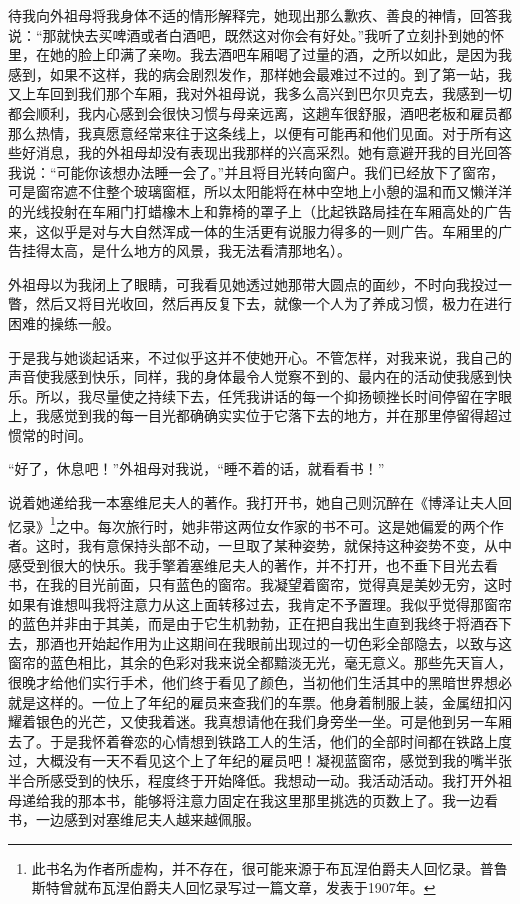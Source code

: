 \par 待我向外祖母将我身体不适的情形解释完，她现出那么歉疚、善良的神情，回答我说：“那就快去买啤酒或者白酒吧，既然这对你会有好处。”我听了立刻扑到她的怀里，在她的脸上印满了亲吻。我去酒吧车厢喝了过量的酒，之所以如此，是因为我感到，如果不这样，我的病会剧烈发作，那样她会最难过不过的。到了第一站，我又上车回到我们那个车厢，我对外祖母说，我多么高兴到巴尔贝克去，我感到一切都会顺利，我内心感到会很快习惯与母亲远离，这趟车很舒服，酒吧老板和雇员都那么热情，我真愿意经常来往于这条线上，以便有可能再和他们见面。对于所有这些好消息，我的外祖母却没有表现出我那样的兴高采烈。她有意避开我的目光回答我说：“可能你该想办法睡一会了。”并且将目光转向窗户。我们已经放下了窗帘，可是窗帘遮不住整个玻璃窗框，所以太阳能将在林中空地上小憩的温和而又懒洋洋的光线投射在车厢门打蜡橡木上和靠椅的罩子上（比起铁路局挂在车厢高处的广告来，这似乎是对与大自然浑成一体的生活更有说服力得多的一则广告。车厢里的广告挂得太高，是什么地方的风景，我无法看清那地名）。
\par 外祖母以为我闭上了眼睛，可我看见她透过她那带大圆点的面纱，不时向我投过一瞥，然后又将目光收回，然后再反复下去，就像一个人为了养成习惯，极力在进行困难的操练一般。
\par 于是我与她谈起话来，不过似乎这并不使她开心。不管怎样，对我来说，我自己的声音使我感到快乐，同样，我的身体最令人觉察不到的、最内在的活动使我感到快乐。所以，我尽量使之持续下去，任凭我讲话的每一个抑扬顿挫长时间停留在字眼上，我感觉到我的每一目光都确确实实位于它落下去的地方，并在那里停留得超过惯常的时间。
\par “好了，休息吧！”外祖母对我说，“睡不着的话，就看看书！”
\par 说着她递给我一本塞维尼夫人的著作。我打开书，她自己则沉醉在《博泽让夫人回忆录》\footnote{此书名为作者所虚构，并不存在，很可能来源于布瓦涅伯爵夫人回忆录。普鲁斯特曾就布瓦涅伯爵夫人回忆录写过一篇文章，发表于1907年。}之中。每次旅行时，她非带这两位女作家的书不可。这是她偏爱的两个作者。这时，我有意保持头部不动，一旦取了某种姿势，就保持这种姿势不变，从中感受到很大的快乐。我手擎着塞维尼夫人的著作，并不打开，也不垂下目光去看书，在我的目光前面，只有蓝色的窗帘。我凝望着窗帘，觉得真是美妙无穷，这时如果有谁想叫我将注意力从这上面转移过去，我肯定不予置理。我似乎觉得那窗帘的蓝色并非由于其美，而是由于它生机勃勃，正在把自我出生直到我终于将酒吞下去，那酒也开始起作用为止这期间在我眼前出现过的一切色彩全部隐去，以致与这窗帘的蓝色相比，其余的色彩对我来说全都黯淡无光，毫无意义。那些先天盲人，很晚才给他们实行手术，他们终于看见了颜色，当初他们生活其中的黑暗世界想必就是这样的。一位上了年纪的雇员来查我们的车票。他身着制服上装，金属纽扣闪耀着银色的光芒，又使我着迷。我真想请他在我们身旁坐一坐。可是他到另一车厢去了。于是我怀着眷恋的心情想到铁路工人的生活，他们的全部时间都在铁路上度过，大概没有一天不看见这个上了年纪的雇员吧！凝视蓝窗帘，感觉到我的嘴半张半合所感受到的快乐，程度终于开始降低。我想动一动。我活动活动。我打开外祖母递给我的那本书，能够将注意力固定在我这里那里挑选的页数上了。我一边看书，一边感到对塞维尼夫人越来越佩服。
